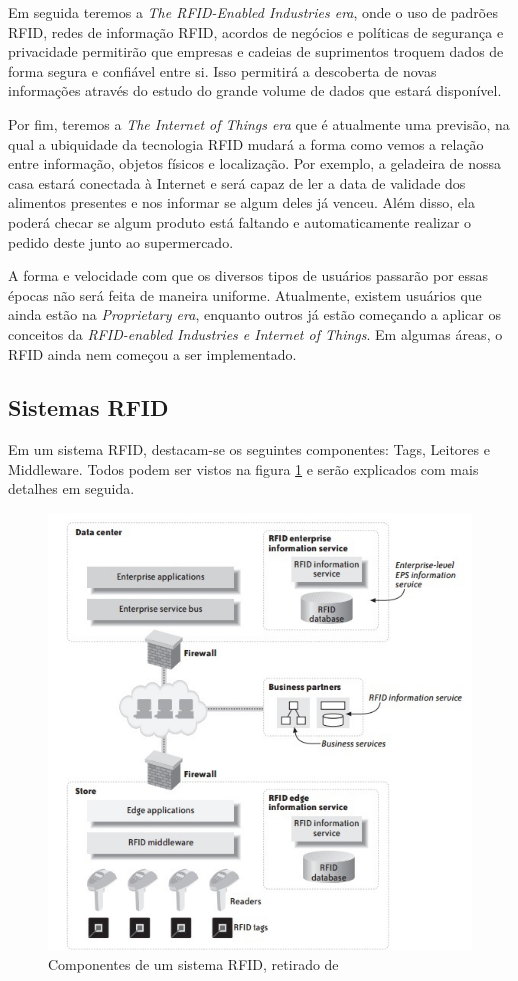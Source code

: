 	Em seguida teremos a \textit{The RFID-Enabled Industries era}, onde o uso de padrões RFID, redes de informação RFID, acordos de negócios e políticas de segurança e privacidade permitirão que empresas e cadeias de suprimentos troquem dados de forma segura e confiável entre si. Isso permitirá a descoberta de novas informações através do estudo  do grande volume de dados que estará disponível.   
	   
	Por fim, teremos a \textit{The Internet of Things era} que é atualmente uma previsão, na qual a ubiquidade da tecnologia RFID mudará a forma como vemos a relação entre informação, objetos físicos e localização. Por exemplo, a geladeira de nossa casa estará conectada à Internet e será capaz de ler a data de validade dos alimentos presentes e nos informar se algum deles já venceu. Além disso, ela poderá checar se algum produto está faltando e automaticamente realizar o pedido deste junto ao supermercado.
	
	A forma e velocidade com que os diversos tipos de usuários passarão por essas épocas não será feita de maneira uniforme. Atualmente, existem usuários que ainda estão na \textit{Proprietary era}, enquanto outros já estão começando a aplicar os conceitos da \textit{RFID-enabled Industries e Internet of Things}. Em algumas áreas, o RFID ainda nem começou a ser implementado.
	
	
	\subsection{Sistemas RFID}
	
	Em um sistema RFID, destacam-se os seguintes componentes: Tags, Leitores e Middleware. Todos podem ser vistos na figura \ref{fig:rfidcomp} e serão explicados com mais detalhes em seguida.
	
	\begin{figure}[h!]
		\centering
		\includegraphics[width=0.5\linewidth]{rfidsys3}
		\caption{Componentes de um sistema RFID, retirado de \cite{rfidbook}}
		\label{fig:rfidcomp}
	\end{figure}
	
